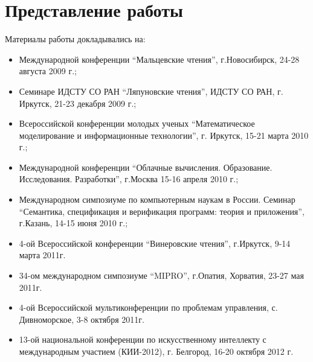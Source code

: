 \section*{Представление работы} 
Материалы работы докладывались на:
\begin{itemize}
\item Международной конференции ``Мальцевские чтения'', г.Новосибирск, 24-28 августа 2009 г.;
\item Семинаре ИДСТУ СО РАН ``Ляпуновские чтения'', ИДСТУ СО РАН, г. Иркутск, 21-23 декабря 2009 г.;
\item Всероссийской конференции молодых ученых ``Математическое моделирование и информационные технологии'', г. Иркутск, 15-21 марта 2010 г.;
\item Международной конференции ``Облачные вычисления. Образование. Исследования. Разработки'', г.Москва 15-16 апреля 2010 г.;
\item Международном симпозиуме по компьютерным наукам в России. Семинар ``Семантика, спецификация и верификация программ: теория и приложения'', г.Казань, 14-15 июня 2010 г.;
\item 4-ой Всероссийской конференции ``Винеровские чтения'', г.Иркутск, 9-14 марта 2011г.
\item 34-ом международном симпозиуме ``MIPRO'', г.Опатия, Хорватия, 23-27 мая 2011г.
\item 4-ой Всероссийской мультиконференции по проблемам управления, с. Дивноморское, 3-8 октября 2011г.
\item 13-ой национальной конференции по искусственному интеллекту с международным участием (КИИ-2012), г. Белгород, 16-20 октября 2012 г.
\end{itemize}




